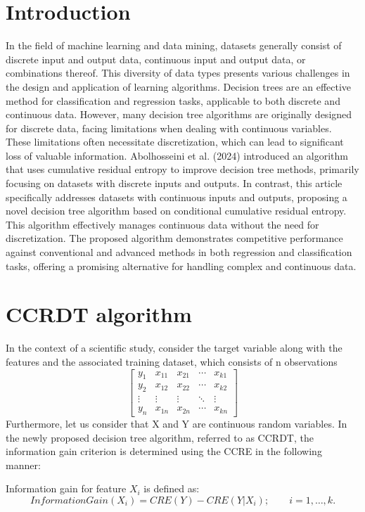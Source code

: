 \documentclass[twoside]{article}
\begin{document}
\section{Introduction}
In the field of machine learning and data mining, datasets generally consist of discrete input and output data, continuous input and output data, or combinations thereof. This diversity of data types presents various challenges in the design and application of learning algorithms. Decision trees are an effective method for classification and regression tasks, applicable to both discrete and continuous data. However, many decision tree algorithms are originally designed for discrete data, facing limitations when dealing with continuous variables. These limitations often necessitate discretization, which can lead to significant loss of valuable information. Abolhosseini et al. (2024) introduced an algorithm that uses cumulative residual entropy to improve decision tree methods, primarily focusing on datasets with discrete inputs and outputs. In contrast, this article specifically addresses datasets with continuous inputs and outputs, proposing a novel decision tree algorithm based on conditional cumulative residual entropy. This algorithm effectively manages continuous data without the need for discretization. The proposed algorithm demonstrates competitive performance against conventional and advanced methods in both regression and classification tasks, offering a promising alternative for handling complex and continuous data. 
\section{CCRDT algorithm}
In the context of a scientific study, consider the target variable along with the features and the associated training dataset, which consists of n observations
\[
\begin{bmatrix}
y_1 & x_{11} & x_{21} & \cdots & x_{k1} \\
y_2 & x_{12} & x_{22} & \cdots & x_{k2} \\
\vdots & \vdots & \vdots & \ddots & \vdots \\
y_n & x_{1n} & x_{2n} & \cdots & x_{kn}
\end{bmatrix}
\]
Furthermore, let us consider that X and Y are continuous random variables. In the newly proposed decision tree algorithm, referred to as CCRDT, the information gain criterion is determined using the CCRE in the following manner: 

Information gain for feature \(X_i\) is defined as:
\begin{equation}\label{2}
InformationGain(X_i) = CRE(Y) - CRE(Y|X_i); \qquad i = 1, \dots, k.
\end{equation}
\end{document}
